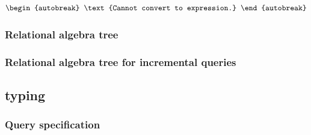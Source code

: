\begin{align*}
\begin{autobreak}
\text{Cannot convert to expression.}
\end{autobreak}
\end{align*}

\subsubsection*{Relational algebra tree}


\subsubsection*{Relational algebra tree for incremental queries}

\subsection{typing}

\subsubsection*{Query specification}

